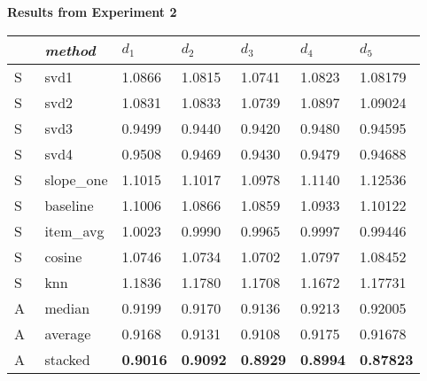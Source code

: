 \begin{table}[p]
  \centering

  \textbf{Results from Experiment 2}

  \vspace{3em}

  \begin{tabular*}{\textwidth}{ l p{3cm} p{1.5cm} p{1.5cm} p{1.5cm} p{1.5cm} p{1.5cm} }
    \toprule
      ~ & \emph{method} & 
      $d_1$ & $d_2$ & $d_3$ & $d_4$ & $d_5$ \\ 
    \midrule
S & svd1       &  1.0866  &  1.0815  &  1.0741  &  1.0823  &  1.08179  \\
S & svd2       &  1.0831  &  1.0833  &  1.0739  &  1.0897  &  1.09024  \\
S & svd3       &  0.9499  &  0.9440  &  0.9420  &  0.9480  &  0.94595  \\
S & svd4       &  0.9508  &  0.9469  &  0.9430  &  0.9479  &  0.94688  \\
S & slope\_one &  1.1015  &  1.1017  &  1.0978  &  1.1140  &  1.12536  \\
S & baseline   &  1.1006  &  1.0866  &  1.0859  &  1.0933  &  1.10122  \\
S & item\_avg  &  1.0023  &  0.9990  &  0.9965  &  0.9997  &  0.99446  \\
S & cosine     &  1.0746  &  1.0734  &  1.0702  &  1.0797  &  1.08452  \\
S & knn        &  1.1836  &  1.1780  &  1.1708  &  1.1672  &  1.17731  \\
\midrule
A & median     &  0.9199  &  0.9170  &  0.9136  &  0.9213  &  0.92005  \\
A & average    &  0.9168  &  0.9131  &  0.9108  &  0.9175  &  0.91678  \\
A & stacked    &  \textbf{0.9016}  &  \textbf{0.9092}  &  \textbf{0.8929}  &  \textbf{0.8994}  &  \textbf{0.87823}  \\
    \bottomrule
  \end{tabular*}

  \vspace{3em}


\end{table}
